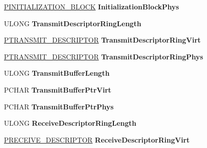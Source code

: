 \begin{DoxyCompactItemize}
\item 
\mbox{\label{struct___a_d_a_p_t_e_r_aacb00fded865e53ededa1713cd240187}} 
\hyperlink{struct___i_n_i_t_i_a_l_i_z_a_t_i_o_n___b_l_o_c_k}{P\+I\+N\+I\+T\+I\+A\+L\+I\+Z\+A\+T\+I\+O\+N\+\_\+\+B\+L\+O\+CK} {\bfseries Initialization\+Block\+Phys}
\item 
\mbox{\label{struct___a_d_a_p_t_e_r_ac72f33e07708072d4dd98b259bb7d459}} 
U\+L\+O\+NG {\bfseries Transmit\+Descriptor\+Ring\+Length}
\item 
\mbox{\label{struct___a_d_a_p_t_e_r_acd64cf678c21fbbc09b52093d3a92ad9}} 
\hyperlink{struct___t_r_a_n_s_m_i_t___d_e_s_c_r_i_p_t_o_r}{P\+T\+R\+A\+N\+S\+M\+I\+T\+\_\+\+D\+E\+S\+C\+R\+I\+P\+T\+OR} {\bfseries Transmit\+Descriptor\+Ring\+Virt}
\item 
\mbox{\label{struct___a_d_a_p_t_e_r_ace52e37f949fc789060fb2f79bf41936}} 
\hyperlink{struct___t_r_a_n_s_m_i_t___d_e_s_c_r_i_p_t_o_r}{P\+T\+R\+A\+N\+S\+M\+I\+T\+\_\+\+D\+E\+S\+C\+R\+I\+P\+T\+OR} {\bfseries Transmit\+Descriptor\+Ring\+Phys}
\item 
\mbox{\label{struct___a_d_a_p_t_e_r_a728c9c716e2e6d630c1374abf4ac30a5}} 
U\+L\+O\+NG {\bfseries Transmit\+Buffer\+Length}
\item 
\mbox{\label{struct___a_d_a_p_t_e_r_af87341311ff1190786f8054638e9281e}} 
P\+C\+H\+AR {\bfseries Transmit\+Buffer\+Ptr\+Virt}
\item 
\mbox{\label{struct___a_d_a_p_t_e_r_a68d16b6453b07dbe50fae55d95d32aa8}} 
P\+C\+H\+AR {\bfseries Transmit\+Buffer\+Ptr\+Phys}
\item 
\mbox{\label{struct___a_d_a_p_t_e_r_a76e7c0174fc1db7b0bf00281c5fe29f3}} 
U\+L\+O\+NG {\bfseries Receive\+Descriptor\+Ring\+Length}
\item 
\mbox{\label{struct___a_d_a_p_t_e_r_a8d67189e477a339eea2a54147cb2d4be}} 
\hyperlink{struct___r_e_c_e_i_v_e___d_e_s_c_r_i_p_t_o_r}{P\+R\+E\+C\+E\+I\+V\+E\+\_\+\+D\+E\+S\+C\+R\+I\+P\+T\+OR} {\bfseries Receive\+Descriptor\+Ring\+Virt}

\end{DoxyCompactItemize}
